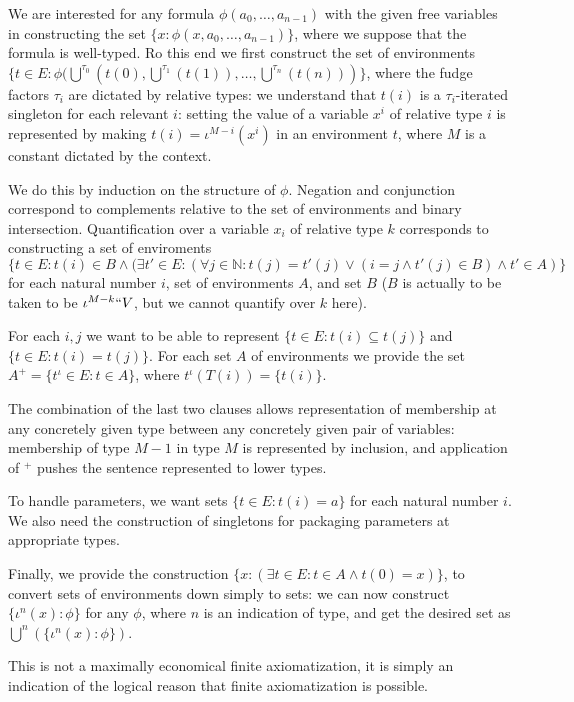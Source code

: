 \documentclass[12pt]{article}
\begin{document}
We are interested for any formula $\phi(a_0,\ldots,a_{n-1})$ with the given free variables in constructing the set $\{x:\phi(x,a_0,\ldots,a_{n-1})\}$, where we suppose that the formula is well-typed.  Ro this end we first construct the set of environments $\{t\in E:\phi(\bigcup^{\tau_{0}}(t(0),\bigcup^{\tau_1}(t(1)),\ldots,\bigcup^{\tau_{n}}(t(n)))\}$, where the fudge factors $\tau_i$ are dictated by relative types:  we understand that $t(i)$ is a $\tau_i$-iterated singleton for each relevant $i$: setting the value of a variable $x^i$ of relative type $i$  is represented by making $t(i)=\iota^{M-i}(x^i)$ in an environment $t$, where $M$ is a constant dictated by the context.

 We do this by induction on the structure of $\phi$.   Negation and conjunction correspond to complements relative to the set of environments and binary intersection.  Quantification
over a variable $x_i$ of relative type $k$ corresponds to constructing a set of enviroments $$\{t\in E:t(i) \in B \wedge(\exists t'\in E :(\forall j \in {\mathbb N}: t(j) = t'(j) \vee (i=j \wedge t'(j) \in B) \wedge t' \in A)\}$$ for each  natural number $i$, set of environments $A$, and set $B$ ($B$ is actually to be taken to be $\iota^{M-k}``V$, but we cannot quantify over $k$ here).

For each $i,j$ we want to be able to represent $\{t\in E:t(i) \subseteq t(j)\}$ and $\{t\in E:t(i) = t(j)\}$.  For each set $A$ of environments we provide the set $A^+= \{t^{\iota}\in E:t \in A\}$, where $t^{\iota}(T(i)) = \{t(i)\}$. 

The combination of the last two clauses allows representation of membership at any concretely given type between any concretely given pair of variables:  membership of type $M-1$ in type $M$ is represented by inclusion,
and application of $^+$ pushes the sentence represented to lower types.

To handle parameters, we want sets $\{t \in E:t(i) = a\}$ for each natural number $i$.  We also need the construction of singletons for packaging parameters at appropriate types.

Finally, we provide the construction $\{x:(\exists t \in E: t \in A \wedge t(0)=x)\}$, to convert sets of environments down simply to sets:  we can now construct $\{\iota^n(x):\phi\}$ for any $\phi$, where $n$ is an indication of type,
and get the desired set as $\bigcup^n(\{\iota^n(x):\phi\})$.

This is not a maximally economical finite axiomatization, it is simply an indication of the logical reason that finite axiomatization is possible.
\end{document}
